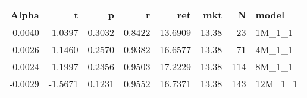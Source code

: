 \begin{table}[ht]
\centering
\begin{tabular}{rrrrrrrl}
  \hline
Alpha & t & p & r & ret & mkt & N & model \\ 
  \hline
-0.0040 & -1.0397 & 0.3032 & 0.8422 & 13.6909 & 13.38 & 23 & 1M\_1\_1 \\ 
  -0.0026 & -1.1460 & 0.2570 & 0.9382 & 16.6577 & 13.38 & 71 & 4M\_1\_1 \\ 
  -0.0024 & -1.1997 & 0.2356 & 0.9503 & 17.2229 & 13.38 & 114 & 8M\_1\_1 \\ 
  -0.0029 & -1.5671 & 0.1231 & 0.9552 & 16.7371 & 13.38 & 143 & 12M\_1\_1 \\ 
   \hline
\end{tabular}
\end{table}

